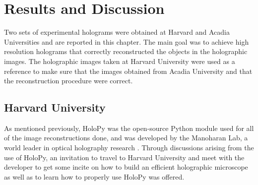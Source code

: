 %
%

\chapter{Results and Discussion} \label{chap:Results}

Two sets of experimental holograms were obtained at Harvard and Acadia
Universities and are reported in this chapter. The main goal was to achieve
high resolution holograms that correctly reconstructed the objects in the
holographic images. The holographic images taken at Harvard University were
used as a reference to make sure that the images obtained from Acadia
University and that the reconstruction procedure were correct.

\section{Harvard University}

As mentioned previously, HoloPy was the open-source Python module used for all
of the image reconstructions
done, and was developed by the Manoharan Lab, a world leader in optical
holography research \cite{Manoharan}. 
Through discussions arising from the use of HoloPy, an invitation to travel to
Harvard University and meet with the developer to get some incite on how to
build an efficient holographic microscope as well as to learn how to properly
use HoloPy was offered.
%
%


